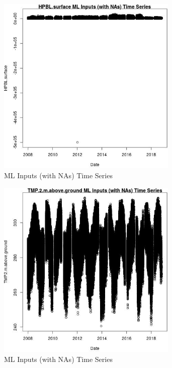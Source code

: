 \begin{figure} 
\centering  
\includegraphics[width=0.77\textwidth]{Code_Outputs/Report_ML_input_PM25_Step4_part_e_de_duplicated_aves_compiled_2019-05-20wNAs_HPBLsurfacevDate.jpg} 
\caption{\label{fig:Report_ML_input_PM25_Step4_part_e_de_duplicated_aves_compiled_2019-05-20wNAsHPBLsurfacevDate}ML Inputs (with NAs) Time Series} 
\end{figure} 
 

\begin{figure} 
\centering  
\includegraphics[width=0.77\textwidth]{Code_Outputs/Report_ML_input_PM25_Step4_part_e_de_duplicated_aves_compiled_2019-05-20wNAs_TMP2mabovegroundvDate.jpg} 
\caption{\label{fig:Report_ML_input_PM25_Step4_part_e_de_duplicated_aves_compiled_2019-05-20wNAsTMP2mabovegroundvDate}ML Inputs (with NAs) Time Series} 
\end{figure} 
 

